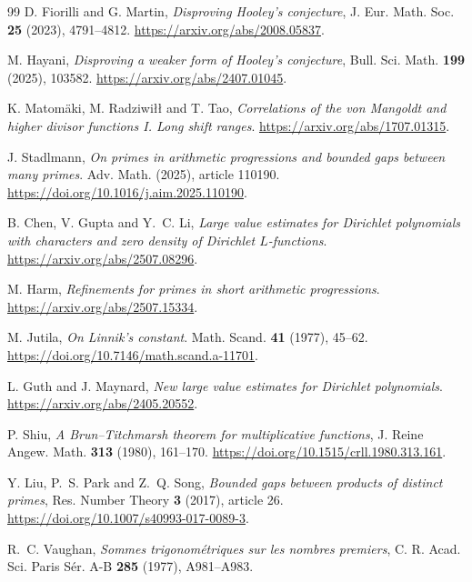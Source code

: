 \documentclass[11pt,a4paper]{article}
\numberwithin{equation}{section}
\begin{document}
{\begin{thebibliography}{99}
D. Fiorilli and G. Martin,
\newblock \emph{Disproving Hooley's conjecture},
\newblock J. Eur. Math. Soc. \textbf{25} (2023), 4791--4812.
\newblock \url{https://arxiv.org/abs/2008.05837}.

M. Hayani,
\newblock \emph{Disproving a weaker form of Hooley's conjecture},
\newblock Bull. Sci. Math. \textbf{199} (2025), 103582.
\newblock \url{https://arxiv.org/abs/2407.01045}.

K. Matom\"aki, M. Radziwi\l\l{} and T. Tao,
\newblock \emph{Correlations of the von Mangoldt and higher divisor functions I.
Long shift ranges}.
\newblock \url{https://arxiv.org/abs/1707.01315}.

J. Stadlmann,
\newblock \emph{On primes in arithmetic progressions and bounded gaps
between many primes}.
\newblock Adv. Math. (2025), article 110190.
\newblock \url{https://doi.org/10.1016/j.aim.2025.110190}.

B. Chen, V. Gupta and Y.~C. Li,
\newblock \emph{Large value estimates for Dirichlet polynomials with
characters and zero density of Dirichlet $L$-functions}.
\newblock \url{https://arxiv.org/abs/2507.08296}.

M. Harm,
\newblock \emph{Refinements for primes in short arithmetic progressions}.
\newblock \url{https://arxiv.org/abs/2507.15334}.

M. Jutila,
\newblock \emph{On Linnik's constant}.
\newblock Math. Scand. \textbf{41} (1977), 45--62.
\newblock \url{https://doi.org/10.7146/math.scand.a-11701}.

L. Guth and J. Maynard,
\newblock \emph{New large value estimates for Dirichlet polynomials}.
\newblock \url{https://arxiv.org/abs/2405.20552}.

P. Shiu,
\newblock \emph{A Brun--Titchmarsh theorem for multiplicative functions},
\newblock J. Reine Angew. Math. \textbf{313} (1980), 161--170.
\newblock \url{https://doi.org/10.1515/crll.1980.313.161}.

Y. Liu, P.~S. Park and Z.~Q. Song,
\newblock \emph{Bounded gaps between products of distinct primes},
\newblock Res. Number Theory \textbf{3} (2017), article 26.
\newblock \url{https://doi.org/10.1007/s40993-017-0089-3}.

R.~C. Vaughan,
\newblock \emph{Sommes trigonom\'etriques sur les nombres premiers},
\newblock C. R. Acad. Sci. Paris S\'er. A-B \textbf{285} (1977), A981--A983.


\end{thebibliography}}
\end{document}
